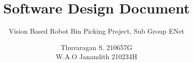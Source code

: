 \documentclass{template}
\begin{document}

\title{\huge{Software Design Document}}
\author{Thuvaragan S. 210657G \\ W.A.O Janandith 210234H}
\subtitle{Vision Based Robot Bin Picking Project, Sub Group ENet}
\beforeabstract
% 
\afterabstract








\footnotesize  %
% 
\end{document}
